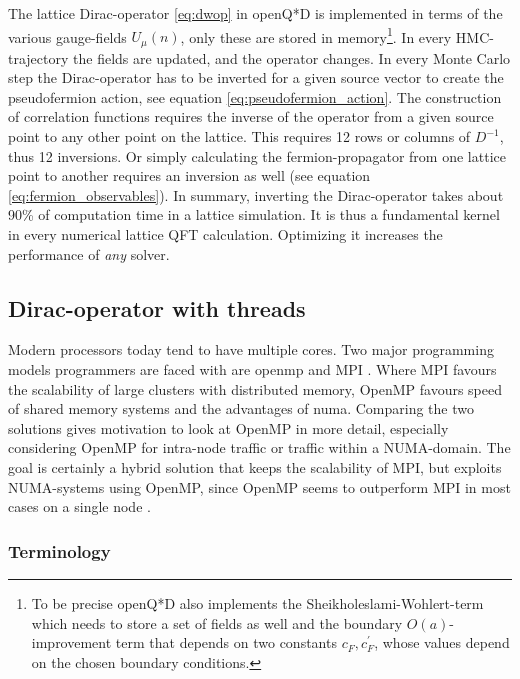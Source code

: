 \documentclass{article}
\theoremstyle{plain} %
\theoremstyle{convention} %
\theoremstyle{remark} %
\numberwithin{equation}{section}
\begin{document}
The lattice Dirac-operator \eqref{eq:dwop} in openQ*D is implemented in terms of the various gauge-fields $U_{\mu}(n)$, only these are stored in memory\footnote{To be precise openQ*D also implements the Sheikholeslami-Wohlert-term \cite{sheikholeslami1985} which needs to store a set of fields as well and the boundary $O(a)$-improvement term that depends on two constants $c_F, c^{\prime}_F$, whose values depend on the chosen boundary conditions.}. In every HMC-trajectory the fields are updated, and the operator changes. In every Monte Carlo step the Dirac-operator has to be inverted for a given source vector to create the pseudofermion action, see equation \eqref{eq:pseudofermion_action}. The construction of correlation functions requires the inverse of the operator from a given source point to any other point on the lattice. This requires \num{12} rows or columns of $D^{-1}$, thus \num{12} inversions. Or simply calculating the fermion-propagator from one lattice point to another requires an inversion as well (see equation \eqref{eq:fermion_observables}). In summary, inverting the Dirac-operator takes about \num{90}\% of computation time in a lattice simulation. It is thus a fundamental kernel in every numerical lattice QFT calculation. Optimizing it increases the performance of \textit{any} solver.

\subsection{Dirac-operator with threads}

\label{sec:threads}

Modern processors today tend to have multiple cores. Two major programming models programmers are faced with are \acrshort{openmp} \cite{openmp45} and \acrshort{MPI} \cite{mpi}. Where MPI favours the scalability of large clusters with distributed memory, OpenMP favours speed of shared memory systems and the advantages of \acrfull{numa}. Comparing the two solutions gives motivation to look at OpenMP in more detail, especially considering OpenMP for intra-node traffic or traffic within a NUMA-domain. The goal is certainly a hybrid solution that keeps the scalability of MPI, but exploits NUMA-systems using OpenMP, since OpenMP seems to outperform MPI in most cases on a single node \cite{chan2011}.

\subsubsection{Terminology}
\end{document}
